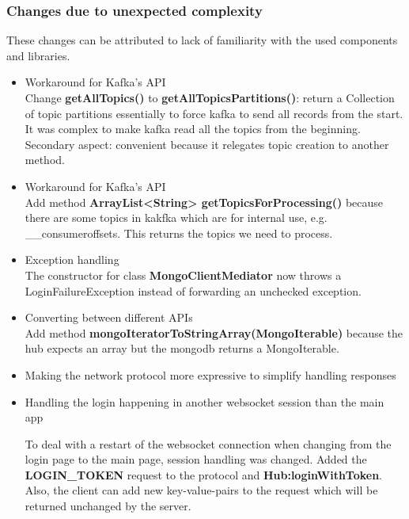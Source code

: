 \documentclass[oneside, english, final]{design}
\begin{document}
\subsubsection{Changes due to unexpected complexity}
These changes can be attributed to lack of familiarity with the used components and libraries.
\begin{itemize}
  \item{Workaround for Kafka's API}
    \\
    Change \textsf{\textbf{getAllTopics()}} to \textsf{\textbf{getAllTopicsPartitions()}}:
    return a Collection of topic partitions essentially to force kafka to send all records from the start.
    It was complex to make kafka read all the topics from the beginning.
    Secondary aspect: convenient because it relegates topic creation to another method.

  \item{Workaround for Kafka's API}
    \\
    Add method \textsf{\textbf{ArrayList<String> getTopicsForProcessing()}}
  because there are some topics in kakfka which are for internal use, e.g. \_\_consumeroffsets.
 This returns the topics we need to process.
	
  \item{Exception handling}
    \\ 
    The constructor for class \textsf{\textbf{MongoClientMediator}} now throws a LoginFailureException instead of forwarding an unchecked exception.

  \item{Converting between different APIs}
    \\ 
    Add method \textsf{\textbf{mongoIteratorToStringArray(MongoIterable)}}
    because the hub expects an array but the mongodb returns a MongoIterable.

  \item{Making the network protocol more expressive to simplify handling responses}
  \item{Handling the login happening in another websocket session than the main app}
    \\
    \begin{itemize}
    To deal with a restart of the websocket connection when changing from the login page to the main page, session handling was changed. Added the \textsf{\textbf{LOGIN\_TOKEN}} request to the protocol and \textsf{\textbf{Hub:loginWithToken}}.
  Also, the client can add new key-value-pairs to the request which will be returned unchanged by the server.


\end{itemize}
\end{itemize}
\end{document}
